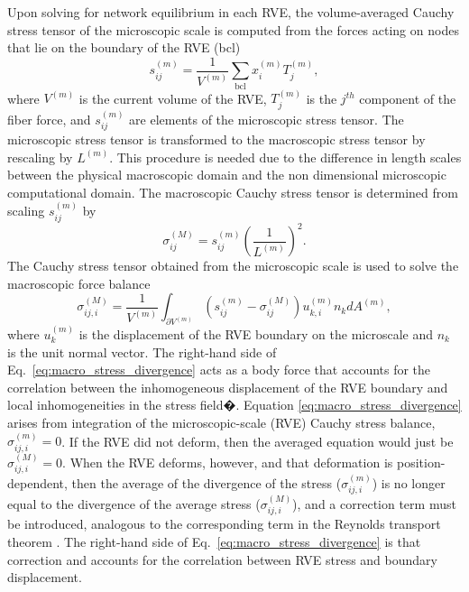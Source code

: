 \documentclass[]{interact}
\begin{document}
Upon solving for network equilibrium in each RVE, the volume-averaged Cauchy stress tensor of the microscopic scale is computed from the forces acting on nodes that lie on the boundary of the RVE (bcl) \citep{Chandran:2007hy,Stylianopoulos:2007dp}
%
\begin{equation}
s_{ij}^{(m)} = \frac{1}{V^{(m)}} \sum_{\text{bcl}} x_i^{(m)} T_j^{(m)} ,
\label{eq:micro_stress_discrete}
\end{equation}
%
where $V^{(m)}$ is the current volume of the RVE, $T_j^{(m)}$ is the $j^{th}$ component of the fiber force, and $s_{ij}^{(m)}$ are elements of the microscopic stress tensor. The microscopic stress tensor is transformed to the macroscopic stress tensor by rescaling by $L^{(m)}$. This procedure is needed due to the difference in length scales between the physical macroscopic domain and the non dimensional microscopic computational domain. The macroscopic Cauchy stress tensor is determined from scaling $s_{ij}^{(m)}$ by 
%
\begin{equation}
\sigma_{ij}^{(M)} = s_{ij}^{(m)}\left(\frac{1}{L^{(m)}}\right)^2.
\label{eq:macro_stress_discrete}
\end{equation}
%
The Cauchy stress tensor obtained from the microscopic scale is used to solve the macroscopic force balance \citep{Chandran:2007hy,Stylianopoulos:2007dp}
%
\begin{equation}
\sigma_{ij,i}^{(M)} = \frac{1}{V^{(m)}} \int_{\partial V^{(m)}} \left( s_{ij}^{(m)} - \sigma_{ij}^{(M)} \right)u_{k,i}^{(m)} n_k dA^{(m)},
\label{eq:macro_stress_divergence}
\end{equation}
%
where $u_k^{(m)}$ is the displacement of the RVE boundary on the microscale and $n_k$ is the unit normal vector. The right-hand side of Eq.\ \eqref{eq:macro_stress_divergence} acts as a body force that accounts for the correlation between the inhomogeneous displacement of the RVE boundary and local inhomogeneities in the stress field�\citep{Chandran:2007hy,Stylianopoulos:2007dp}. Equation \eqref{eq:macro_stress_divergence} arises from integration of the microscopic-scale (RVE) Cauchy stress balance, $\sigma_{ij,i}^{(m)} = 0$. If the RVE did not deform, then the averaged equation would just be $\sigma^{(M)}_{ij,i}=0$. When the RVE deforms, however, and that deformation is position-dependent, then the average of the divergence of the stress ($\sigma_{ij,i}^{(m)}$) is no longer equal to the divergence of the average stress ($\sigma_{ij,i}^{(M)}$), and a correction term must be introduced, analogous to the corresponding term in the Reynolds transport theorem \citep{Whitaker-1999}. The right-hand side of Eq.\ \eqref{eq:macro_stress_divergence} is that correction and accounts for the correlation between RVE stress and boundary displacement.
\end{document}
